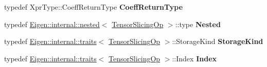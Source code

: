 \begin{DoxyCompactItemize}
typedef Xpr\+Type\+::\+Coeff\+Return\+Type {\bfseries Coeff\+Return\+Type}
\item 
\mbox{\label{class_eigen_1_1_tensor_slicing_op_ae98b99e385ec0a0c6734a1fdeaa725e6}} 
typedef \hyperlink{struct_eigen_1_1internal_1_1nested}{Eigen\+::internal\+::nested}$<$ \hyperlink{class_eigen_1_1_tensor_slicing_op}{Tensor\+Slicing\+Op} $>$\+::type {\bfseries Nested}
\item 
\mbox{\label{class_eigen_1_1_tensor_slicing_op_a9fa7921b8ca3b05dd049132afe696294}} 
typedef \hyperlink{struct_eigen_1_1internal_1_1traits}{Eigen\+::internal\+::traits}$<$ \hyperlink{class_eigen_1_1_tensor_slicing_op}{Tensor\+Slicing\+Op} $>$\+::Storage\+Kind {\bfseries Storage\+Kind}
\item 
\mbox{\label{class_eigen_1_1_tensor_slicing_op_a58b9599622a8514c9c4f0f550cd113fa}} 
typedef \hyperlink{struct_eigen_1_1internal_1_1traits}{Eigen\+::internal\+::traits}$<$ \hyperlink{class_eigen_1_1_tensor_slicing_op}{Tensor\+Slicing\+Op} $>$\+::Index {\bfseries Index}
\end{DoxyCompactItemize}
